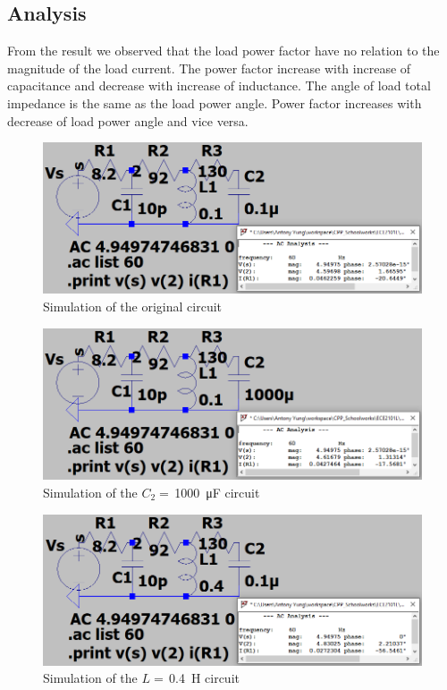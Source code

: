 \documentclass{article}
\begin{document}
\subsection*{Analysis}
From the result we observed that the load power factor have no relation to the magnitude of the load current. The power factor increase with increase of capacitance and decrease with increase of inductance. The angle of load total impedance is the same as the load power angle. Power factor increases with decrease of load power angle and vice versa.


\newpage
\begin{figure}[H]
    \centering
        \includegraphics[width=\textwidth]{ECE2101L_Lab09_B1_original.png}
        \caption{Simulation of the original circuit}
\end{figure}

\begin{figure}[H]
    \centering
        \includegraphics[width=\textwidth]{ECE2101L_Lab09_B1_1000u.png}
        \caption{Simulation of the $C_2=$\,\SI{1000}{\micro\farad} circuit}
\end{figure}

\begin{figure}[H]
    \centering
        \includegraphics[width=\textwidth]{ECE2101L_Lab09_B1_0.4H.png}
        \caption{Simulation of the $L=$\,\SI{0.4}{\henry} circuit}
\end{figure}
\end{document}
